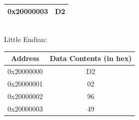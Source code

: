 \documentclass{article}
\begin{document}
{\begin{tabular}{|c c|}
          \hline
          0x20000003 & D2 \\
          \hline
     \end{tabular} \\
     \linebreak
     Little Endian: \\
     \linebreak
     \begin{tabular}{|c c|}
          \hline
          Address & Data Contents (in hex) \\
          \hline
          0x20000000 & D2 \\
          \hline
          0x20000001 & 02 \\
          \hline
          0x20000002 & 96 \\
          \hline
          0x20000003 & 49 \\
          \hline
     \end{tabular}
     \linebreak
}
\end{document}
